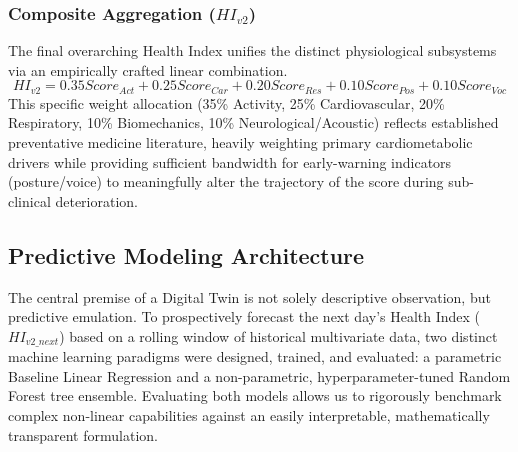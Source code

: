 \documentclass[11pt,a4paper]{article}
\begin{document}
\subsubsection{Composite Aggregation ($HI_{v2}$)}
The final overarching Health Index unifies the distinct physiological subsystems via an empirically crafted linear combination. 
\begin{equation}
HI_{v2} = 0.35 Score_{Act} + 0.25 Score_{Car} + 0.20 Score_{Res} + 0.10 Score_{Pos} + 0.10 Score_{Voc}
\end{equation}
This specific weight allocation (35\% Activity, 25\% Cardiovascular, 20\% Respiratory, 10\% Biomechanics, 10\% Neurological/Acoustic) reflects established preventative medicine literature, heavily weighting primary cardiometabolic drivers while providing sufficient bandwidth for early-warning indicators (posture/voice) to meaningfully alter the trajectory of the score during sub-clinical deterioration.

\subsection{Predictive Modeling Architecture}
The central premise of a Digital Twin is not solely descriptive observation, but predictive emulation. To prospectively forecast the next day's Health Index ($HI_{v2\_next}$) based on a rolling window of historical multivariate data, two distinct machine learning paradigms were designed, trained, and evaluated: a parametric Baseline Linear Regression and a non-parametric, hyperparameter-tuned Random Forest tree ensemble. Evaluating both models allows us to rigorously benchmark complex non-linear capabilities against an easily interpretable, mathematically transparent formulation.
\end{document}
